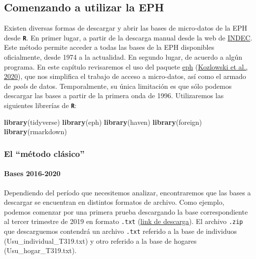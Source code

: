 \documentclass[
]{article}
\newenvironment{Shaded}{\begin{snugshade}}{\end{snugshade}}
\newcommand{\FunctionTok}[1]{\textcolor[rgb]{0.13,0.29,0.53}{\textbf{#1}}}
\newcommand{\NormalTok}[1]{#1}
\begin{document}
\hypertarget{eph2}{%
\subsection{Comenzando a utilizar la EPH}\label{eph2}}

Existen diversas formas de descargar y abrir las bases de micro-datos de la EPH desde \textbf{\texttt{R}}. En primer lugar, a partir de la descarga manual desde la web de \href{https://www.indec.gob.ar/indec/web/Institucional-Indec-BasesDeDatos}{INDEC}. Este método permite acceder a todas las bases de la EPH disponibles oficialmente, desde 1974 a la actualidad. En segundo lugar, de acuerdo a algún programa. En este capítulo revisaremos el uso del paquete \href{https://github.com/holatam/eph}{eph} (\protect\hyperlink{ref-kozlowski2020}{Kozlowski et al., 2020}), que nos simplifica el trabajo de acceso a micro-datos, así como el armado de \emph{pools} de datos. Temporalmente, su única limitación es que sólo podemos descargar las bases a partir de la primera onda de 1996. Utilizaremos las siguientes librerías de \textbf{\texttt{R}}:

\begin{Shaded}
\begin{Highlighting}[]
\FunctionTok{library}\NormalTok{(tidyverse)}
\FunctionTok{library}\NormalTok{(eph)}
\FunctionTok{library}\NormalTok{(haven)}
\FunctionTok{library}\NormalTok{(foreign)}
\FunctionTok{library}\NormalTok{(rmarkdown)}
\end{Highlighting}
\end{Shaded}

\hypertarget{el-muxe9todo-cluxe1sico}{%
\subsubsection{El ``método clásico''}\label{el-muxe9todo-cluxe1sico}}

\hypertarget{bases-2016-2020}{%
\paragraph{Bases 2016-2020}\label{bases-2016-2020}}

Dependiendo del período que necesitemos analizar, encontraremos que las bases a descargar se encuentran en distintos formatos de archivo. Como ejemplo, podemos comenzar por una primera prueba descargando la base correspondiente al tercer trimestre de 2019 en formato \texttt{.txt} (\href{https://www.indec.gob.ar/ftp/cuadros/menusuperior/eph/EPH_usu_3_Trim_2019_txt.zip}{link de descarga}). El archivo \texttt{.zip} que descarguemos contendrá un archivo \texttt{.txt} referido a la base de individuos (Usu\_individual\_T319.txt) y otro referido a la base de hogares (Usu\_hogar\_T319.txt).
\end{document}
